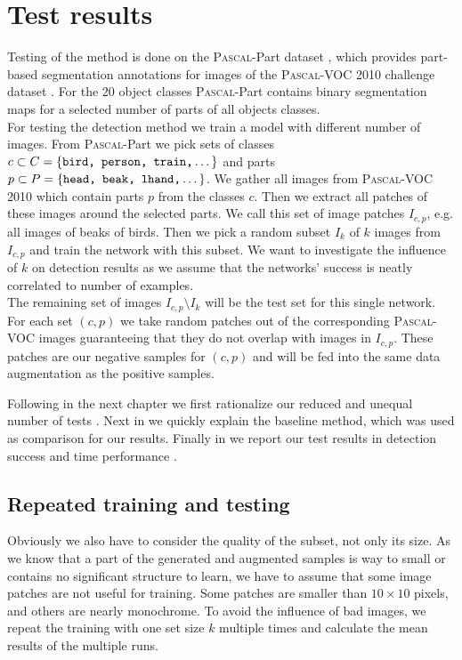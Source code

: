 %
\chapter{Test results}
\label{sec:results}
Testing of the method is done on the \textsc{Pascal}-Part dataset \citep{Chen_2014_CVPR}, which provides part-based segmentation annotations for images of the \textsc{Pascal}-VOC 2010 challenge dataset \citep{pascal-voc-2010}. For the 20 object classes \textsc{Pascal}-Part contains binary segmentation maps for a selected number of parts of all objects classes.\\
For testing the detection method we train a model with different number of images. From \textsc{Pascal}-Part we pick sets of classes $c \subset C = \{\texttt{bird, person, train,}\dotsc\}$ and parts $p \subset P = \{\texttt{head, beak, lhand,}\dotsc\}$. We gather all images from \textsc{Pascal}-VOC 2010 which contain parts $p$ from the classes $c$. Then we extract all patches of these images around the selected parts. We call this set of image patches $I_{c,p}$, e.g. all images of beaks of birds. Then we pick a random subset $I_k$ of $k$ images from $I_{c,p}$ and train the network with this subset. We want to investigate the influence of $k$ on detection results as we assume that the networks' success is neatly correlated to number of examples.\\
The remaining set of images $I_{c,p} \setminus I_k$ will be the test set for this single network. For each set $(c,p)$ we take random patches out of the corresponding \textsc{Pascal}-VOC images guaranteeing that they do not overlap with images in $I_{c,p}$. These patches are our negative samples for $(c,p)$ and will be fed into the same data augmentation as the positive samples.

Following in the next chapter we first rationalize our reduced and unequal number of tests . Next in  we quickly explain the baseline method, which was used as comparison for our results. Finally in  we report our test results in detection success and time performance .

\section{Repeated training and testing}
\label{sec:results:repeat}
Obviously we also have to consider the quality of the subset, not only its size. As we know that a part of the generated and augmented samples is way to small or contains no significant structure to learn, we have to assume that some image patches are not useful for training. Some patches are smaller than $10\times10$ pixels, and others are nearly monochrome. To avoid the influence of bad images, we repeat the training with one set size $k$ multiple times and calculate the mean results of the multiple runs.

